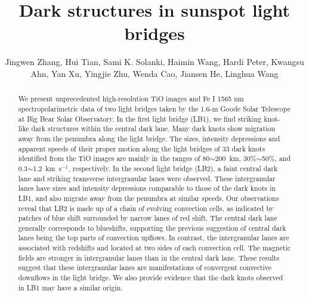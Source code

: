 \documentclass[preprint2]{aastex}
\begin{document}
\title{Dark structures in sunspot light bridges}

\author{Jingwen Zhang, Hui Tian, Sami K. Solanki, Haimin Wang, Hardi Peter, Kwangsu Ahn, Yan Xu, Yingjie Zhu, Wenda Cao, Jiansen He, Linghua Wang}



\begin{abstract}
We present unprecedented high-resolution TiO images and Fe I 1565 nm spectropolarimetric data of two light bridges taken by the 1.6-m Goode Solar Telescope at Big Bear Solar Observatory. In the first light bridge (LB1), we find striking knot-like dark structures within the central dark lane. Many dark knots show migration away from the penumbra along the light bridge. The sizes, intensity depressions and apparent speeds of their proper motion along the light bridges of 33 dark knots identified from the TiO images are mainly in the ranges of 80$\sim$200~km, 30\%$\sim$50\%, and 0.3$\sim$1.2~km~s$^{-1}$, respectively. In the second light bridge (LB2), a faint central dark lane and striking transverse intergranular lanes were observed. These intergranular lanes have sizes and intensity depressions comparable to those of the dark knots in LB1, and also migrate away from the penumbra at similar speeds. Our observations reveal that LB2 is made up of a chain of evolving convection cells, as indicated by patches of blue shift surrounded by narrow lanes of red shift. The central dark lane generally corresponds to blueshifts, supporting the previous suggestion of central dark lanes being the top parts of convection upflows. In contrast, the intergranular lanes are associated with redshifts and located at two sides of each convection cell. The magnetic fields are stronger in intergranular lanes than in the central dark lane. These results suggest that these intergranular lanes are manifestations of convergent convective downflows in the light bridge. We also provide evidence that the dark knots observed in LB1 may have a similar origin.
\end{abstract}
\end{document}
